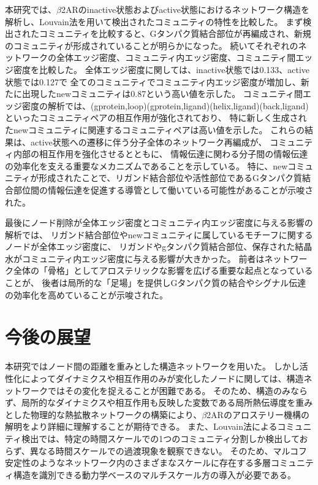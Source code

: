 本研究では、$\beta$2ARのinactive状態およびactive状態におけるネットワーク構造を解析し、Louvain法を用いて検出されたコミュニティの特性を比較した。
まず検出されたコミュニティを比較すると、Gタンパク質結合部位が再編成され、新規のコミュニティが形成されていることが明らかになった。
続いてそれぞれのネットワークの全体エッジ密度、コミュニティ内エッジ密度、コミュニティ間エッジ密度を比較した。
全体エッジ密度に関しては、inactive状態では0.133、active状態では0.127で
全てのコミュニティでコミュニティ内エッジ密度が増加し、新たに出現したnewコミュニティは0.87という高い値を示した。
コミュニティ間エッジ密度の解析では、(gprotein,loop)(gprotein,ligand)(helix,ligand)(back,ligand)といったコミュニティペアの相互作用が強化されており、
特に新しく生成されたnewコミュニティに関連するコミュニティペアは高い値を示した。
これらの結果は、active状態への遷移に伴う分子全体のネットワーク再編成が、
コミュニティ内部の相互作用を強化させるとともに、
情報伝達に関わる分子間の情報伝達の効率化を支える重要なメカニズムであることを示している。
特に、newコミュニティが形成されたことで、リガンド結合部位や活性部位であるGタンパク質結合部位間の情報伝達を促進する導管として働いている可能性があることが示唆された。

最後にノード削除が全体エッジ密度とコミュニティ内エッジ密度に与える影響の解析では、
リガンド結合部位やnewコミュニティに属しているモチーフに関するノードが全体エッジ密度に、
リガンドやgタンパク質結合部位、保存された結晶水がコミュニティ内エッジ密度に与える影響が大きかった。
前者はネットワーク全体の「骨格」としてアロステリックな影響を広げる重要な起点となっていることが、
後者は局所的な「足場」を提供しGタンパク質の結合やシグナル伝達の効率化を高めていることが示唆された。

\section{今後の展望}
本研究ではノード間の距離を重みとした構造ネットワークを用いた。
しかし活性化によってダイナミクスや相互作用のみが変化したノードに関しては、構造ネットワークではその変化を捉えることが困難である。
そのため、構造のみならず、局所的なダイナミクスや相互作用も反映した変数である局所熱伝導度\cite{yamato2022computational}を重みとした物理的な熱拡散ネットワークの構築により、$\beta$2ARのアロステリー機構の解明をより詳細に理解することが期待できる。
また、Louvain法によるコミュニティ検出では、特定の時間スケールでの1つのコミュニティ分割しか検出しておらず、異なる時間スケールでの過渡現象を観察できない。
そのため、マルコフ安定性\cite{amor2014uncovering}のようなネットワーク内のさまざまなスケールに存在する多層コミュニティ構造を識別できる動力学ベースのマルチスケール方の導入が必要である。
